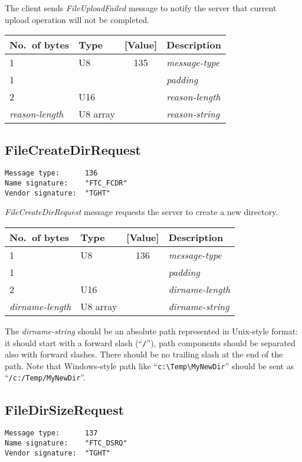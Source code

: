 \documentclass[a4paper]{article}
\newcommand{\typestr}[1]{\textit{#1}}
\begin{document}
The client sends \typestr{FileUploadFailed} message to notify the
server that current upload operation will not be completed.

\begin{tabular}{l|lc|l} \hline
No.\ of bytes & Type & [Value] & Description \\ \hline
1 & U8  & 135 & \typestr{message-type} \\
1 &     &     & \typestr{padding} \\
2 & U16 &     & \typestr{reason-length} \\
\typestr{reason-length} & U8 array & & \typestr{reason-string} \\
\hline\end{tabular}


\newpage
\subsection{FileCreateDirRequest}
\begin{verbatim}
Message type:      136
Name signature:    "FTC_FCDR"
Vendor signature:  "TGHT"
\end{verbatim}

\typestr{FileCreateDirRequest} message requests the server to create a
new directory.

\begin{tabular}{l|lc|l} \hline
No.\ of bytes & Type & [Value] & Description \\ \hline
1 & U8  & 136 & \typestr{message-type} \\
1 &     &     & \typestr{padding} \\
2 & U16 &     & \typestr{dirname-length} \\
\typestr{dirname-length} & U8 array & & \typestr{dirname-string} \\
\hline\end{tabular}

The \typestr{dirname-string} should be an absolute path represented in
Unix-style format: it should start with a forward slash
(``\verb|/|''), path components should be separated also with forward
slashes. There should be no trailing slash at the end of the path.
Note that Windows-style path like
``\verb|c:\Temp\MyNewDir|'' should be sent as
``\verb|/c:/Temp/MyNewDir|''.


\newpage
\subsection{FileDirSizeRequest}
\begin{verbatim}
Message type:      137
Name signature:    "FTC_DSRQ"
Vendor signature:  "TGHT"
\end{verbatim}
\end{document}
